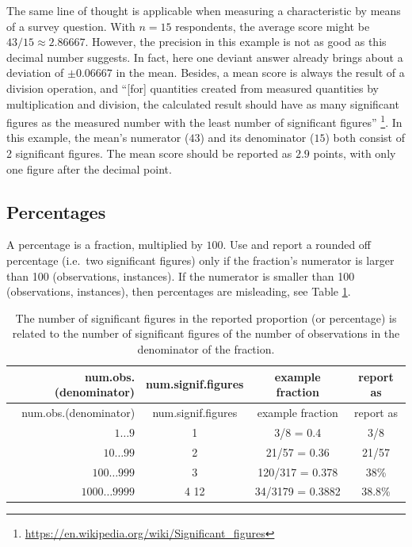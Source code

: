 \documentclass[
]{book}
\begin{document}
The same line of thought is applicable when measuring a characteristic
by means of a survey question. With \(n=15\) respondents, the average score
might be \(43/15 \approx 2.86667\). However, the precision
in this example is not as good as this decimal number suggests. In fact,
here one deviant answer already brings about a deviation of
\(\pm0.06667\) in the mean. Besides, a mean score
is always the result of a division operation, and
``{[}for{]} quantities created from measured quantities by multiplication and division, the calculated result should have as many significant figures as the measured number with the least number of significant figures'' \footnote{\url{https://en.wikipedia.org/wiki/Significant_figures}}.
In this example, the mean's numerator (\(43\)) and its denominator (\(15\)) both consist
of 2 significant figures. The mean score should be reported as \(2.9\) points, with only
one figure after the decimal point.

\hypertarget{percentages}{%
\subsection{Percentages}\label{percentages}}

A percentage is a fraction, multiplied by \(100\).
Use and report a rounded off percentage (i.e.~two significant
figures) only if the fraction's numerator is larger
than 100 (observations, instances). If the numerator is smaller than 100
(observations, instances), then percentages are misleading,
see Table \ref{tab:signiffigurepercentage}.

\begin{longtable}[]{@{}rccc@{}}
\caption{\label{tab:signiffigurepercentage} The number of significant figures in the reported
proportion (or percentage) is related to the number of significant figures of the number
of observations in the denominator of the fraction.}\tabularnewline
\toprule\noalign{}
num.obs.(denominator) & num.signif.figures & example fraction & report as \\
\midrule\noalign{}
\endfirsthead
\toprule\noalign{}
num.obs.(denominator) & num.signif.figures & example fraction & report as \\
\midrule\noalign{}
\endhead
\bottomrule\noalign{}
\endlastfoot
\(1\dots9\) & 1 & 3/8 = 0.4 & 3/8 \\
\(10\dots99\) & 2 & 21/57 = 0.36 & 21/57 \\
\(100\dots999\) & 3 & 120/317 = 0.378 & 38\% \\
\(1000\dots9999\) & 4 12 & 34/3179 = 0.3882 & 38.8\% \\
\end{longtable}
\end{document}
